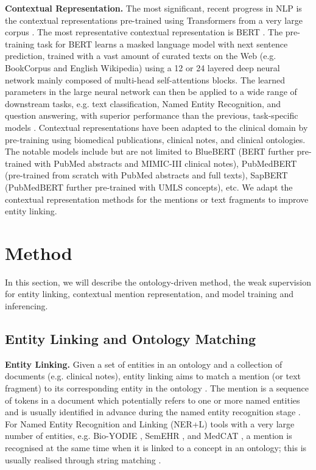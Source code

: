 \documentclass[twocolumn]{bmcart}
\begin{document}
\textbf{Contextual Representation.} The most significant, recent progress in NLP is the contextual representations pre-trained using Transformers \cite{vaswani2017attention} from a very large corpus \cite{devlin-etal-2019-bert}. The most representative contextual representation is BERT \cite{devlin-etal-2019-bert}. The pre-training task for BERT learns a masked language model with next sentence prediction, trained with a vast amount of curated texts on the Web (e.g. BookCorpus and English Wikipedia) using a 12 or 24 layered deep neural network mainly composed of multi-head self-attentions blocks. The learned parameters in the large neural network can then be applied to a wide range of downstream tasks, e.g. text classification, Named Entity Recognition, and question answering, with superior performance than the previous, task-specific models \cite{devlin-etal-2019-bert}. Contextual representations have been adapted to the clinical domain by pre-training using biomedical publications, clinical notes, and clinical ontologies. The notable models include but are not limited to BlueBERT \cite{peng2019transfer} (BERT further pre-trained with PubMed abstracts and MIMIC-III clinical notes), PubMedBERT \cite{Gu2021} (pre-trained from scratch with PubMed abstracts and full texts), SapBERT \cite{liu2021sap} (PubMedBERT further pre-trained with UMLS concepts), etc. We adapt the contextual representation methods for the mentions or text fragments to improve entity linking.

\section*{Method}
\label{sec:method}

In this section, we will describe the ontology-driven method, the weak supervision for entity linking, contextual mention representation, and model training and inferencing.

\subsection*{Entity Linking and Ontology Matching}

\textbf{Entity Linking.} Given a set of entities  in an ontology and a collection of documents (e.g. clinical notes), entity linking aims to match a mention (or text fragment)  to its corresponding entity  in the ontology \cite{shen2015}. The mention  is a sequence of tokens in a document which potentially refers to one or more named entities and is usually identified in advance during the named entity recognition stage \cite{shen2015}. For Named Entity Recognition and Linking (NER+L) tools with a very large number of entities, e.g. Bio-YODIE \cite{gorrell2018}, SemEHR \cite{Wu2018semehr}, and MedCAT \cite{Kraljevic2021}, a mention  is recognised at the same time when it is linked to a concept in an ontology; this is usually realised through string matching \cite{gorrell2018,Kraljevic2021}.
\end{document}

